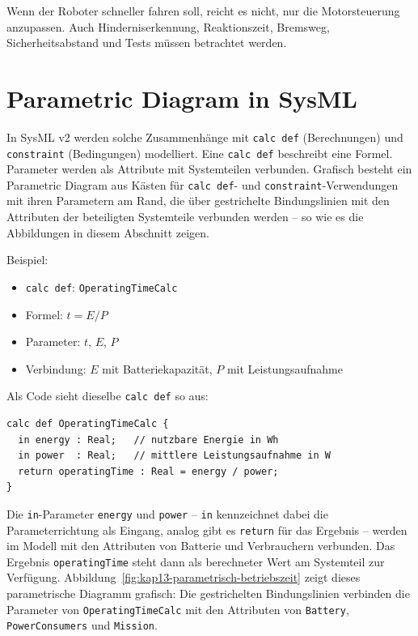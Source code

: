 \begin{praxisbox}
Wenn der Roboter schneller fahren soll, reicht es nicht, nur die Motorsteuerung anzupassen. Auch Hinderniserkennung, Reaktionszeit, Bremsweg, Sicherheitsabstand und Tests müssen betrachtet werden.
\end{praxisbox}

\section{Parametric Diagram in SysML}
In SysML v2 werden solche Zusammenhänge mit \texttt{calc def} (Berechnungen) und \texttt{constraint} (Bedingungen) modelliert. Eine \texttt{calc def} beschreibt eine Formel. Parameter werden als Attribute mit Systemteilen verbunden. Grafisch besteht ein Parametric Diagram aus Kästen für \texttt{calc def}- und \texttt{constraint}-Verwendungen mit ihren Parametern am Rand, die über gestrichelte Bindungslinien mit den Attributen der beteiligten Systemteile verbunden werden – so wie es die Abbildungen in diesem Abschnitt zeigen.

Beispiel:

\begin{itemize}
    \item \texttt{calc def}: \texttt{OperatingTimeCalc}
    \item Formel: \(t = E / P\)
    \item Parameter: \(t\), \(E\), \(P\)
    \item Verbindung: \(E\) mit Batteriekapazität, \(P\) mit Leistungsaufnahme
\end{itemize}

Als Code sieht dieselbe \texttt{calc def} so aus:

\begin{lstlisting}
calc def OperatingTimeCalc {
  in energy : Real;   // nutzbare Energie in Wh
  in power  : Real;   // mittlere Leistungsaufnahme in W
  return operatingTime : Real = energy / power;
}
\end{lstlisting}

Die \texttt{in}-Parameter \texttt{energy} und \texttt{power} – \texttt{in} kennzeichnet dabei die Parameterrichtung als Eingang, analog gibt es \texttt{return} für das Ergebnis – werden im Modell mit den Attributen von Batterie und Verbrauchern verbunden. Das Ergebnis \texttt{operatingTime} steht dann als berechneter Wert am Systemteil zur Verfügung. Abbildung~\ref{fig:kap13-parametrisch-betriebszeit} zeigt dieses parametrische Diagramm grafisch: Die gestrichelten Bindungslinien verbinden die Parameter von \texttt{OperatingTimeCalc} mit den Attributen von \texttt{Battery}, \texttt{PowerConsumers} und \texttt{Mission}.

